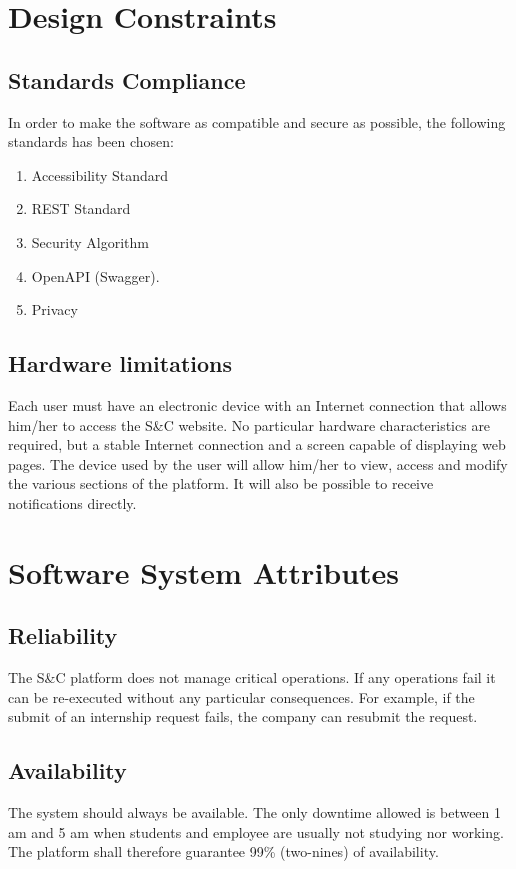 \section{Design Constraints}
\subsection{Standards Compliance}
In order to make the software as compatible and secure as possible, the following standards has been chosen: 
\begin{enumerate}
    \item Accessibility Standard
    \item REST Standard
    \item Security Algorithm 
    \item OpenAPI (Swagger).
    \item Privacy
\end{enumerate}


\subsection{Hardware limitations}
Each user must have an electronic device with an Internet connection that allows him/her to access the S\&C website. No particular hardware characteristics are required, but a stable Internet connection and a screen capable of displaying web pages. The device used by the user will allow him/her to view, access and modify the various sections of the platform. It will also be possible to receive notifications directly.
\section{Software System Attributes}
\subsection{Reliability}
The S\&C platform does not manage critical operations. If any operations fail it can be re-executed without any particular consequences. For example, if the submit of an internship request fails, the company can resubmit the request.
\subsection{Availability}
The system should always be available. The only downtime allowed is between 1 am and 5 am when students and employee are usually not studying nor working. The platform shall therefore guarantee 99\% (two-nines) of availability.
